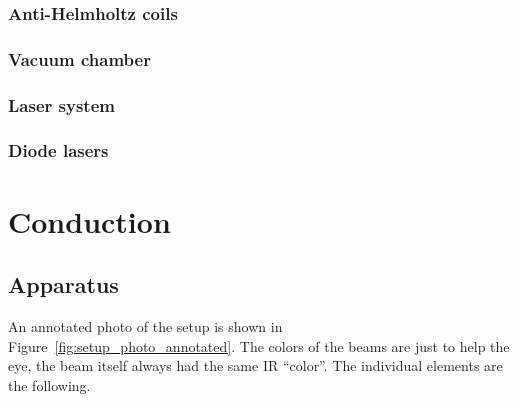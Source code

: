 \documentclass[11pt, english, fleqn, DIV=15, headinclude, BCOR=2cm]{scrreprt}
\begin{document}
\subsection{Anti-Helmholtz coils}

\subsection{Vacuum chamber}

\subsection{Laser system}

\subsection{Diode lasers}

\chapter{Conduction}

\section{Apparatus}

An annotated photo of the setup is shown in
Figure~\ref{fig:setup_photo_annotated}. The colors of the beams are just to
help the eye, the beam itself always had the same IR \enquote{color}. The
individual elements are the following.
\end{document}
